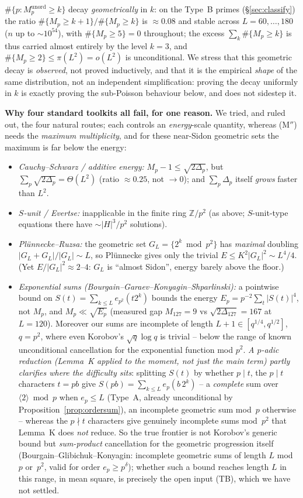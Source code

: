 \documentclass[11pt]{article}
\theoremstyle{plain}
\theoremstyle{definition}
\theoremstyle{remark}
\newcommand{\Z}{\mathbb{Z}}
\newcommand{\ep}{e_p}
\begin{document}
$\#\{p:M_p^{\mathrm{unord}}\ge k\}$ decay \emph{geometrically} in $k$: on the
Type~B primes (\S\ref{sec:classify}) the ratio
$\#\{M_p\ge k{+}1\}/\#\{M_p\ge k\}$ is $\approx0.08$ and stable across
$L=60,\dots,180$ ($n$ up to $\sim10^{54}$), with $\#\{M_p\ge5\}=0$ throughout;
the excess $\sum_k\#\{M_p\ge k\}$ is thus carried almost entirely by the level
$k=3$, and $\#\{M_p\ge2\}\le\pi(L^2)=o(L^2)$ is unconditional. We stress that
this geometric decay is \emph{observed}, not proved inductively, and that it is
the empirical \emph{shape} of the same distribution, not an independent
simplification: proving the decay uniformly in $k$ is exactly proving the
sub-Poisson behaviour below, and does not sidestep it.

\textbf{Why four standard toolkits all fail, for one reason.} We tried, and
ruled out, the four natural routes; each controls an \emph{energy}-scale
quantity, whereas (M$''$) needs the \emph{maximum multiplicity}, and for these
near-Sidon geometric sets the maximum is far below the energy:
\begin{itemize}
\item \emph{Cauchy--Schwarz / additive energy:} $M_p-1\le\sqrt{2\Delta_p}$,
but $\sum_p\sqrt{2\Delta_p}=\Theta(L^2)$ (ratio $\approx0.25$, not $\to0$); and
$\sum_p\Delta_p$ itself \emph{grows} faster than $L^2$.
\item \emph{$S$-unit / Evertse:} inapplicable in the finite ring $\Z/p^2$
(as above; $S$-unit-type equations there have $\sim|H|^3/p^2$ solutions).
\item \emph{Plünnecke--Ruzsa:} the geometric set $G_L=\{2^k\bmod p^2\}$ has
\emph{maximal} doubling $|G_L+G_L|/|G_L|\sim L$, so Plünnecke gives only the
trivial $E\le K^2|G_L|^2\sim L^4/4$. (Yet $E/|G_L|^2\approx2$--$4$: $G_L$ is
``almost Sidon'', energy barely above the floor.)
\item \emph{Exponential sums (Bourgain--Garaev--Konyagin--Shparlinski):} a
pointwise bound on $S(t)=\sum_{k\le L}e_{p^2}(t2^k)$ bounds the energy
$E_p=p^{-2}\sum_t|S(t)|^4$, not $M_p$, and $M_p\ll\sqrt{E_p}$ (measured gap
$M_{127}=9$ vs $\sqrt{2\Delta_{127}}=167$ at $L=120$). Moreover our sums are
incomplete of length $L+1\in[q^{1/4},q^{1/2}]$, $q=p^2$, where even Korobov's
$\sqrt q\log q$ is trivial -- below the range of known unconditional cancellation
for the exponential function mod $p^2$. \emph{A $p$-adic reduction (Lemma~K
applied to the moment, not just the main term) partly clarifies where the
difficulty sits}: splitting $S(t)$ by whether $p\mid t$, the $p\mid t$
characters $t=pb$ give $S(pb)=\sum_{k\le L}e_p(b\,2^k)$ -- a \emph{complete} sum
over $\langle2\rangle\bmod p$ when $\ep\le L$ (Type~A, already unconditional by
Proposition~\ref{prop:ordersum}), an incomplete geometric sum mod~$p$ otherwise
-- whereas the $p\nmid t$ characters give genuinely incomplete sums mod~$p^2$
that Lemma~K does \emph{not} reduce. So the true frontier is not Korobov's
generic bound but \emph{sum-product} cancellation for the geometric progression
itself (Bourgain--Glibichuk--Konyagin: incomplete geometric sums of length $L$
mod~$p$ or~$p^2$, valid for order $\ep\ge p^\delta$); whether such a bound
reaches length $L$ in this range, in mean square, is precisely the open input
(TB), which we have not settled.
\end{itemize}
\end{document}
